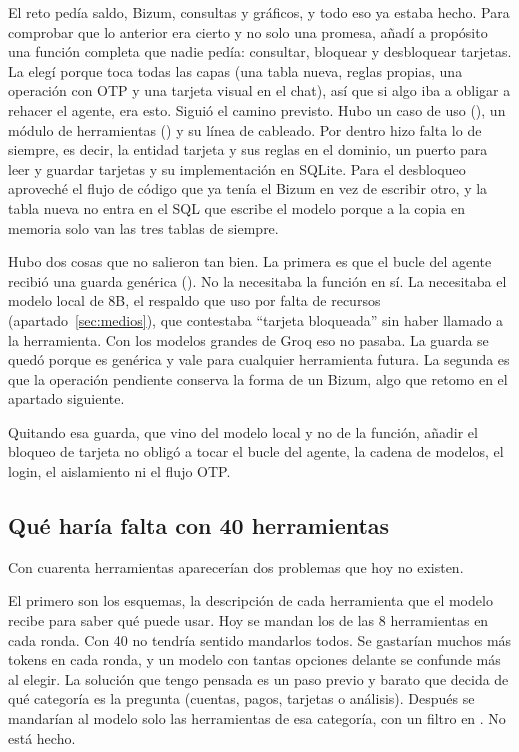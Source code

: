 El reto pedía saldo, Bizum, consultas y gráficos, y todo eso ya estaba hecho. Para comprobar que lo anterior era cierto
y no solo una promesa, añadí a propósito una función completa que nadie pedía: consultar, bloquear y desbloquear
tarjetas. La elegí porque toca todas las capas (una tabla nueva, reglas propias, una operación con OTP y una tarjeta
visual en el chat), así que si algo iba a obligar a rehacer el agente, era esto. Siguió el camino previsto. Hubo un caso de uso (), un módulo de herramientas
() y su línea de cableado. Por dentro hizo falta lo de siempre, es decir, la entidad tarjeta y
sus reglas en el dominio, un puerto para leer y guardar tarjetas y su implementación en SQLite. Para el desbloqueo
aproveché el flujo de código que ya tenía el Bizum en vez de escribir otro, y la tabla nueva no entra en el SQL que
escribe el modelo porque a la copia en memoria solo van las tres tablas de siempre.

Hubo dos cosas que no salieron tan bien. La primera es que el bucle del agente recibió una guarda genérica
(). No la necesitaba la función en sí. La necesitaba el modelo local de 8B, el respaldo
que uso por falta de recursos (apartado~\ref{sec:medios}), que contestaba ``tarjeta bloqueada'' sin haber llamado a la
herramienta. Con los modelos grandes de Groq eso no pasaba. La guarda se quedó porque es genérica y vale para
cualquier herramienta futura. La segunda es que la operación pendiente conserva la forma de un Bizum, algo que
retomo en el apartado siguiente.

Quitando esa guarda, que vino del modelo local y no de la función, añadir el bloqueo de tarjeta no obligó a tocar el
bucle del agente, la cadena de modelos, el login, el aislamiento ni el flujo OTP.

\subsection{Qué haría falta con 40 herramientas}\label{sec:cuarenta}

Con cuarenta herramientas aparecerían dos problemas que hoy no existen.

El primero son los esquemas, la descripción de cada herramienta que el modelo recibe para saber qué puede usar. Hoy
se mandan los de las 8 herramientas en cada ronda. Con 40 no tendría sentido mandarlos todos. Se gastarían muchos más
tokens en cada ronda, y un modelo con tantas opciones delante se confunde más al elegir. La solución que tengo pensada
es un paso previo y barato que decida de qué categoría es la pregunta (cuentas, pagos, tarjetas o análisis). Después
se mandarían al modelo solo las herramientas de esa categoría, con un filtro en
. No está hecho.

